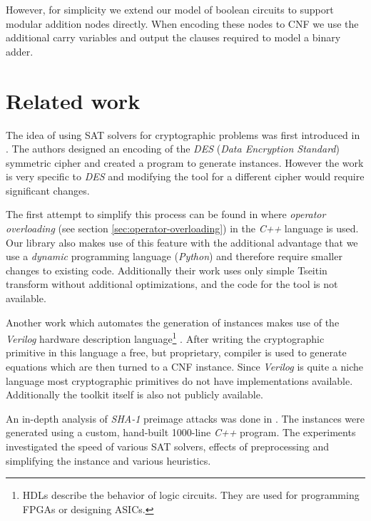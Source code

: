 However, for simplicity we extend our model of boolean circuits to support modular addition nodes directly.
When encoding these nodes to CNF we use the additional carry variables and output the clauses required to model a binary adder.

\section{Related work}
\label{sec:related-work}
The idea of using SAT solvers for cryptographic problems was first introduced in \cite{massacci2000logical}.
The authors designed an encoding of the \emph{DES} (\emph{Data Encryption Standard}) symmetric cipher and created a program to generate instances.
However the work is very specific to \emph{DES} and modifying the tool for a different cipher would require significant changes.

The first attempt to simplify this process can be found in \cite{jovanovic2005logical} where \emph{operator overloading} (see section \ref{sec:operator-overloading}) in the \emph{C++} language is used.
Our library also makes use of this feature with the additional advantage that we use a \emph{dynamic} programming language (\emph{Python}) and therefore require smaller changes to existing code.
Additionally their work uses only simple Tseitin transform without additional optimizations, and the code for the tool is not available.

Another work which automates the generation of instances makes use of the \emph{Verilog} hardware description language\footnote{HDLs describe the behavior of logic circuits. They are used for programming FPGAs or designing ASICs.} \cite{morawiecki2013sat}.
After writing the cryptographic primitive in this language a free, but proprietary, compiler is used to generate equations which are then turned to a CNF instance.
Since \emph{Verilog} is quite a niche language most cryptographic primitives do not have implementations available.
Additionally the toolkit itself is also not publicly available.

An in-depth analysis of \emph{SHA-1} preimage attacks was done in \cite{nossum2012sat}.
The instances were generated using a custom, hand-built 1000-line \emph{C++} program.
The experiments investigated the speed of various SAT solvers, effects of preprocessing and simplifying the instance and various heuristics.


%
%
% 
